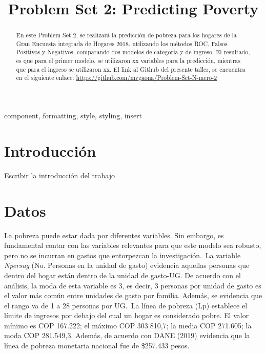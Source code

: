 \documentclass[conference, 10pt]{IEEEtran}
\begin{document}
\title{Problem Set 2: Predicting Poverty\\}

\author{
\and
{}
}

\maketitle

\begin{abstract}
En este Problem Set 2, se realizará la predicción de pobreza para los hogares de la Gran Encuesta integrada de Hogares 2018, utilizando
los métodos ROC, Falsos Positivos y Negativos, comparando dos modelos de categoría y de ingreso. El resultado, es que para el primer modelo, se utilizaron xx variables para la predicción, mientras que para el ingreso se utilizaron xx. El link al Github del presente taller, se encuentra en el siguiente enlace: \url{https://github.com/mvgaona/Problem-Set-N-mero-2}\\

\end{abstract}

\begin{IEEEkeywords}
component, formatting, style, styling, insert
\end{IEEEkeywords}

\section{Introducción}
Escribir la introducción del trabajo

\section{Datos}
La pobreza puede estar dada por diferentes variables. Sin embargo, es fundamental contar con las variables relevantes para que este modelo sea robusto, pero no se incurran en gastos que entorpezcan la investigación.\
La variable \textit{Npersug} (No. Personas en la unidad de gasto) evidencia aquellas personas que dentro del hogar están dentro de la unidad de gasto-UG. De acuerdo con el análisis, la moda de esta variable es 3, es decir, 3 personas por unidad de gasto es el valor más común entre unidades de gasto por familia. Además, se evidencia que el rango va de 1 a 28 personas por UG.\
La línea de pobreza (Lp) establece el límite de ingresos por debajo del cual un hogar es considerado pobre. El valor mínimo es COP 167.222;  el máximo COP 303.810,7; la media COP 271.605; la moda COP 281.549,3. Además, de acuerdo con DANE (2019) evidencia que la línea de pobreza monetaria nacional fue de \$257.433 pesos.\
\end{document}

